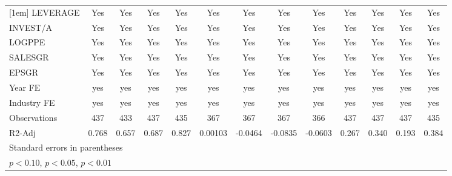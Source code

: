 \begin{table}[htbp]
\begin{tabular}{l*{12}{c}}
[1em]
LEVERAGE            &         Yes         &         Yes         &         Yes         &         Yes         &         Yes         &         Yes         &         Yes         &         Yes         &         Yes         &         Yes         &         Yes         &         Yes         \\
[1em]
INVEST/A            &         Yes         &         Yes         &         Yes         &         Yes         &         Yes         &         Yes         &         Yes         &         Yes         &         Yes         &         Yes         &         Yes         &         Yes         \\
[1em]
LOGPPE              &         Yes         &         Yes         &         Yes         &         Yes         &         Yes         &         Yes         &         Yes         &         Yes         &         Yes         &         Yes         &         Yes         &         Yes         \\
[1em]
SALESGR             &         Yes         &         Yes         &         Yes         &         Yes         &         Yes         &         Yes         &         Yes         &         Yes         &         Yes         &         Yes         &         Yes         &         Yes         \\
[1em]
EPSGR               &         Yes         &         Yes         &         Yes         &         Yes         &         Yes         &         Yes         &         Yes         &         Yes         &         Yes         &         Yes         &         Yes         &         Yes         \\
\hline
Year FE             &         yes         &         yes         &         yes         &         yes         &         yes         &         yes         &         yes         &         yes         &         yes         &         yes         &         yes         &         yes         \\
Industry FE         &         yes         &         yes         &         yes         &         yes         &         yes         &         yes         &         yes         &         yes         &         yes         &         yes         &         yes         &         yes         \\
Observations        &         437         &         433         &         437         &         435         &         367         &         367         &         367         &         366         &         437         &         437         &         437         &         435         \\
R2-Adj              &       0.768         &       0.657         &       0.687         &       0.827         &     0.00103         &     -0.0464         &     -0.0835         &     -0.0603         &       0.267         &       0.340         &       0.193         &       0.384         \\
\hline\hline
\multicolumn{13}{l}{\footnotesize Standard errors in parentheses}\\
\multicolumn{13}{l}{\footnotesize \sym{*} \(p<0.10\), \sym{**} \(p<0.05\), \sym{***} \(p<0.01\)}\\
\end{tabular}
\end{table}
